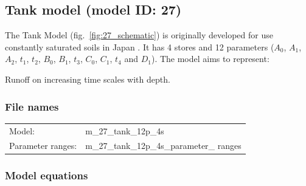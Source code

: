 \subsection{Tank model (model ID: 27)}
The Tank Model (fig.~\ref{fig:27_schematic}) is originally developed for use constantly saturated soils in Japan \citep{Sugawara1979,Sugawara1995}. It has 4 stores and 12 parameters ($A_0$, $A_1$, $A_2$, $t_1$, $t_2$, $B_0$, $B_1$, $t_3$, $C_0$, $C_1$, $t_4$ and $D_1$). The model aims to represent:

\begin{itemizecompact}
\item Runoff on increasing time scales with depth.
\end{itemizecompact}

\subsubsection{File names}
\begin{tabular}{@{}ll}
Model: &m\_27\_tank\_12p\_4s \\
Parameter ranges: &m\_27\_tank\_12p\_4s\_parameter\_ ranges \\
\end{tabular}

\subsubsection{Model equations}

